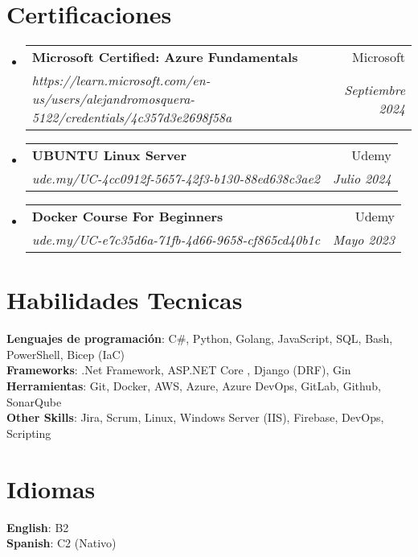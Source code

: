 \documentclass[letterpaper,11pt]{article}
\makeatletter
\newcommand{\resumeSubheading}[4]{
  \vspace{-2pt}\item
    \begin{tabular*}{0.97\textwidth}[t]{l@{\extracolsep{\fill}}r}
      \textbf{#1} & #2 \\
      \textit{\small#3} & \textit{\small #4} \\
    \end{tabular*}\vspace{-7pt}
}
\newcommand{\resumeSubHeadingListStart}{\begin{itemize}[leftmargin=0.15in, label={}]}
\newcommand{\resumeSubHeadingListEnd}{\end{itemize}}
\makeatother
\begin{document}
\section{Certificaciones}


  \resumeSubHeadingListStart
    \resumeSubheading
      {Microsoft Certified: Azure Fundamentals}{Microsoft}
      {https://learn.microsoft.com/en-us/users/alejandromosquera-5122/credentials/4c357d3e2698f58a}{Septiembre 2024}
  \resumeSubHeadingListEnd
  
  \resumeSubHeadingListStart
    \resumeSubheading
      {UBUNTU Linux Server}{Udemy}
      {ude.my/UC-4cc0912f-5657-42f3-b130-88ed638c3ae2}{Julio 2024}
  \resumeSubHeadingListEnd

  \resumeSubHeadingListStart
    \resumeSubheading
      {Docker Course For Beginners}{Udemy}
      {ude.my/UC-e7c35d6a-71fb-4d66-9658-cf865cd40b1c}{Mayo 2023}
  \resumeSubHeadingListEnd



%

\section{Habilidades Tecnicas}
 \begin{itemize}[leftmargin=0.15in, label={}]
    \small{\item{
     \textbf{Lenguajes de programación}{: C\#, Python, Golang, JavaScript, SQL, Bash, PowerShell, Bicep (IaC)} \\
     \textbf{Frameworks}{: .Net Framework, ASP.NET Core , Django (DRF), Gin} \\
     \textbf{Herramientas}{: Git, Docker, AWS, Azure, Azure DevOps, GitLab, Github, SonarQube} \\
     \textbf{Other Skills}{: Jira, Scrum, Linux, Windows Server (IIS), Firebase, DevOps, Scripting}
    }}
 \end{itemize}

\section{Idiomas}
 \begin{itemize}[leftmargin=0.15in, label={}]
    \small{\item{
     \textbf{English}{: B2} \\
     \textbf{Spanish}{: C2 (Nativo)} \\
    }}
 \end{itemize}

\end{document}
